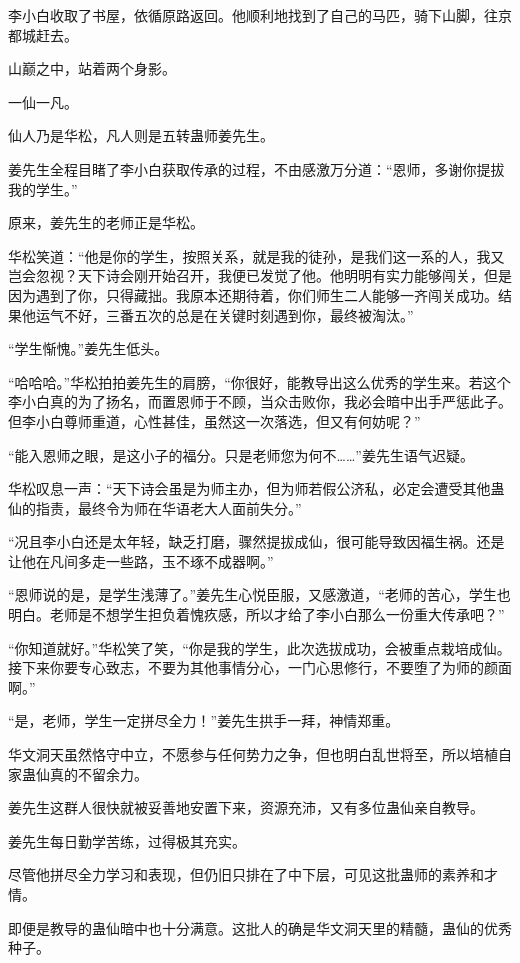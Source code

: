 \begin{this_body}
李小白收取了书屋，依循原路返回。他顺利地找到了自己的马匹，骑下山脚，往京都城赶去。

山巅之中，站着两个身影。

一仙一凡。

仙人乃是华松，凡人则是五转蛊师姜先生。

姜先生全程目睹了李小白获取传承的过程，不由感激万分道：“恩师，多谢你提拔我的学生。”

原来，姜先生的老师正是华松。

华松笑道：“他是你的学生，按照关系，就是我的徒孙，是我们这一系的人，我又岂会忽视？天下诗会刚开始召开，我便已发觉了他。他明明有实力能够闯关，但是因为遇到了你，只得藏拙。我原本还期待着，你们师生二人能够一齐闯关成功。结果他运气不好，三番五次的总是在关键时刻遇到你，最终被淘汰。”

“学生惭愧。”姜先生低头。

“哈哈哈。”华松拍拍姜先生的肩膀，“你很好，能教导出这么优秀的学生来。若这个李小白真的为了扬名，而置恩师于不顾，当众击败你，我必会暗中出手严惩此子。但李小白尊师重道，心性甚佳，虽然这一次落选，但又有何妨呢？”

“能入恩师之眼，是这小子的福分。只是老师您为何不……”姜先生语气迟疑。

华松叹息一声：“天下诗会虽是为师主办，但为师若假公济私，必定会遭受其他蛊仙的指责，最终令为师在华语老大人面前失分。”

“况且李小白还是太年轻，缺乏打磨，骤然提拔成仙，很可能导致因福生祸。还是让他在凡间多走一些路，玉不琢不成器啊。”

“恩师说的是，是学生浅薄了。”姜先生心悦臣服，又感激道，“老师的苦心，学生也明白。老师是不想学生担负着愧疚感，所以才给了李小白那么一份重大传承吧？”

“你知道就好。”华松笑了笑，“你是我的学生，此次选拔成功，会被重点栽培成仙。接下来你要专心致志，不要为其他事情分心，一门心思修行，不要堕了为师的颜面啊。”

“是，老师，学生一定拼尽全力！”姜先生拱手一拜，神情郑重。

华文洞天虽然恪守中立，不愿参与任何势力之争，但也明白乱世将至，所以培植自家蛊仙真的不留余力。

姜先生这群人很快就被妥善地安置下来，资源充沛，又有多位蛊仙亲自教导。

姜先生每日勤学苦练，过得极其充实。

尽管他拼尽全力学习和表现，但仍旧只排在了中下层，可见这批蛊师的素养和才情。

即便是教导的蛊仙暗中也十分满意。这批人的确是华文洞天里的精髓，蛊仙的优秀种子。


\end{this_body}
